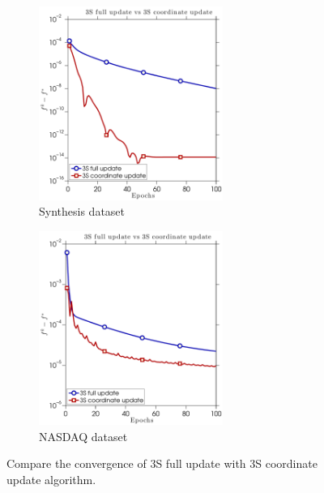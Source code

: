 \begin{figure} \centering
    \begin{subfigure}[b]{0.45\linewidth}
        \includegraphics[width=60mm]{./figs/synth_data_f_err_cropped}
        \caption{Synthesis dataset}
        \label{fig:a}
    \end{subfigure} %
    \quad
    \begin{subfigure}[b]{0.45\linewidth}
        \includegraphics[width=60mm]{./figs/real_data_f_err_cropped}
        \caption{NASDAQ dataset}
        \label{fig:a}
    \end{subfigure} %
    \caption{Compare the convergence of 3S full update with 3S coordinate update algorithm.}
    \label{fig:3s_results}
\end{figure}

